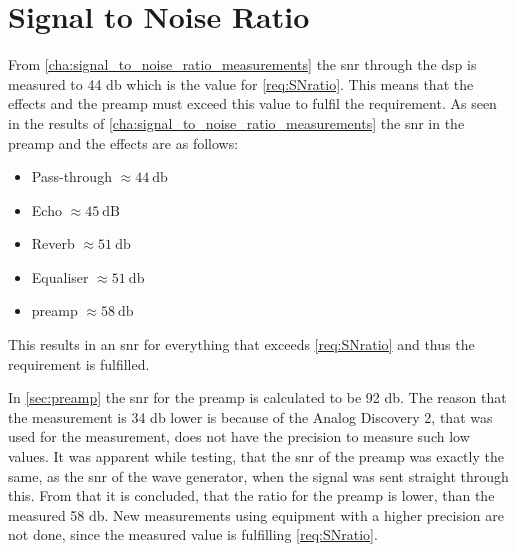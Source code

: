\section{Signal to Noise Ratio}
From \autoref{cha:signal_to_noise_ratio_measurements} the \gls{snr} through the \gls{dsp} is measured to 44 \si{\decibel} which is the value for \autoref{req:SNratio}. This means that the effects and the \gls{preamp} must exceed this value to fulfil the requirement. As seen in the results of \autoref{cha:signal_to_noise_ratio_measurements} the \gls{snr} in the \gls{preamp} and the effects are as follows:

\begin{itemize}
	\item Pass-through $\approx \SI{44}{\decibel}$	
	\item Echo $\approx \SI{45}{\deci\bel}$ 
	\item Reverb $\approx \SI{51}{\decibel}$
	\item Equaliser $\approx \SI{51}{\decibel}$
	\item \gls{preamp} $\approx \SI{58}{\decibel}$
\end{itemize}

This results in an \gls{snr} for everything that exceeds \autoref{req:SNratio} and thus the requirement is fulfilled. 

In \autoref{sec:preamp} the \gls{snr} for the \gls{preamp} is calculated to be 92 \si{\decibel}. The reason that the measurement is 34 \si{\decibel} lower is because of the Analog Discovery 2, that was used for the measurement, does not have the precision to measure such low values. It was apparent while testing, that the \gls{snr} of the \gls{preamp} was exactly the same, as the \gls{snr} of the wave generator, when the signal was sent straight through this. From that it is concluded, that the ratio for the \gls{preamp} is lower, than the measured 58 \si{\decibel}. New measurements using equipment with a higher precision are not done, since the measured value is fulfilling \autoref{req:SNratio}.

